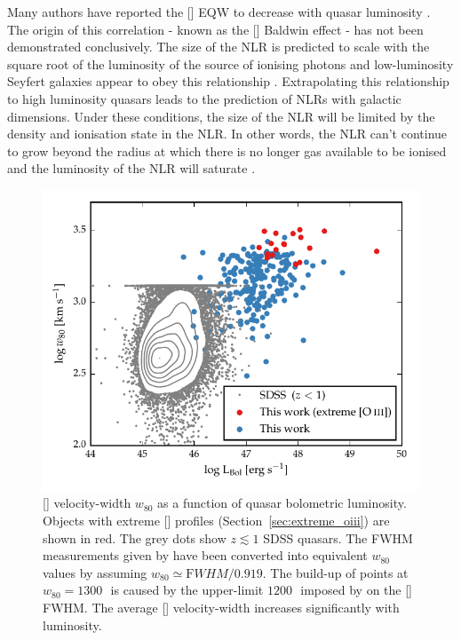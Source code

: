 Many authors have reported the [] EQW to decrease with quasar luminosity \citep[e.g.][]{brotherton96,sulentic04,baskin05b,zhang11,stern12}.
The origin of this correlation - known as the [] Baldwin effect \citep[e.g.][]{baldwin77} - has not been demonstrated conclusively. 
The size of the NLR is predicted to scale with the square root of the luminosity of the source of ionising photons \citep[e.g.][]{netzer90} and low-luminosity Seyfert galaxies appear to obey this relationship \citep[e.g.][]{bennert02}. 
Extrapolating this relationship to high luminosity quasars leads to the prediction of NLRs with galactic dimensions.
Under these conditions, the size of the NLR will be limited by the density and ionisation state in the NLR. 
In other words, the NLR can't continue to grow beyond the radius at which there is no longer gas available to be ionised and the luminosity of the NLR will saturate \citep[e.g.][]{hainline13,hainline14}. 

\begin{figure}[t!]
    \centering
    \includegraphics[width=\columnwidth]{figures/chapter04/lum_w80.pdf} 
    \caption[{}]{[] velocity-width $w_{80}$ as a function of quasar bolometric luminosity. Objects with extreme [] profiles (Section~\ref{sec:extreme_oiii}) are shown in red. The grey dots show $z\lesssim1$ SDSS quasars. The FWHM measurements given by \citet{shen11} have been converted into equivalent $w_{80}$ values by assuming $w_{80} \simeq {\mathrm FWHM} / 0.919$. The build-up of points at $w_{80}=1300$\,\kms\, is caused by the upper-limit $1200$\,\kms\, imposed by \citet{shen11} on the [] FWHM. The average [] velocity-width increases significantly with luminosity. } 
    \label{fig:lum_w80}
\end{figure}


